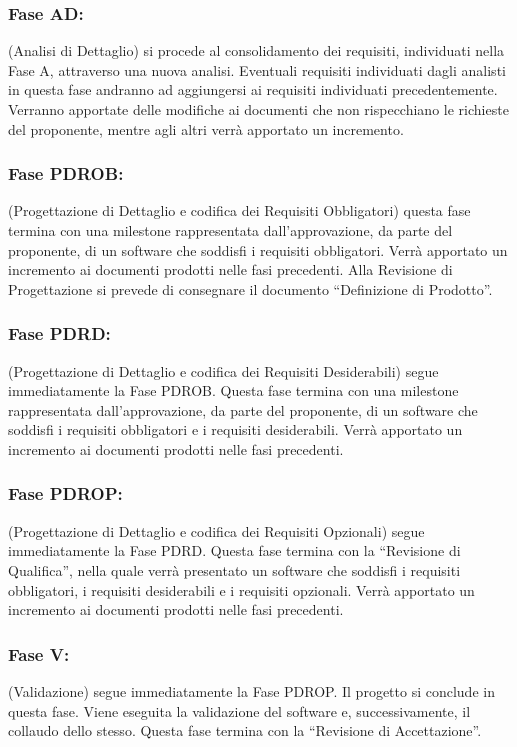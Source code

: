 \documentclass[../introduzione.tex]{subfiles}
\begin{document}
		\subsubsection{Fase AD:}
		(Analisi di Dettaglio) si procede al consolidamento dei requisiti, individuati nella Fase A, attraverso una nuova analisi.
		Eventuali requisiti individuati dagli analisti in questa fase andranno ad aggiungersi ai requisiti individuati precedentemente. 
		Verranno apportate delle modifiche ai documenti che non rispecchiano le richieste del proponente, mentre agli altri verrà apportato un incremento.


		\subsubsection{Fase PDROB:}
		(Progettazione di Dettaglio e codifica dei Requisiti Obbligatori) questa fase termina con una milestone rappresentata dall’approvazione, da parte del proponente, di un software che soddisfi i requisiti obbligatori.
		Verrà apportato un incremento ai documenti prodotti nelle fasi precedenti.
		Alla Revisione di Progettazione si prevede di consegnare il documento “Definizione di Prodotto”.
  
  
		\subsubsection{Fase PDRD:}
		(Progettazione di Dettaglio e codifica dei Requisiti Desiderabili) segue immediatamente la Fase PDROB. Questa fase termina con una milestone rappresentata dall’approvazione, da parte del proponente, di un software che soddisfi i requisiti obbligatori e i requisiti desiderabili.
		Verrà apportato un incremento ai documenti prodotti nelle fasi precedenti.


		\subsubsection{Fase PDROP:}
		(Progettazione di Dettaglio e codifica dei Requisiti Opzionali) segue immediatamente la Fase PDRD. Questa fase termina con la “Revisione di Qualifica”, nella quale verrà presentato un software che soddisfi i requisiti obbligatori, i requisiti desiderabili e i requisiti opzionali.
		Verrà apportato un incremento ai documenti prodotti nelle fasi precedenti.


		\subsubsection{Fase V:}
		(Validazione) segue immediatamente la Fase PDROP. Il progetto si conclude in questa fase. Viene eseguita la validazione del software e, successivamente, il collaudo dello stesso.
		Questa fase termina con la “Revisione di Accettazione”. 
\end{document}
